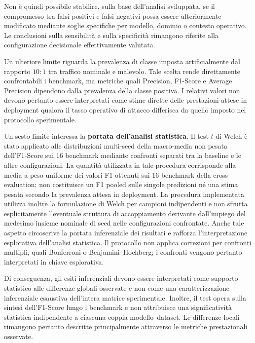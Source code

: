 Non è quindi possibile stabilire, sulla base dell'analisi sviluppata, se il compromesso tra falsi positivi e falsi negativi possa essere ulteriormente modificato mediante soglie specifiche per modello, dominio o contesto operativo.
Le conclusioni sulla sensibilità e sulla specificità rimangono riferite alla configurazione decisionale effettivamente valutata.

Un ulteriore limite riguarda la prevalenza di classe imposta artificialmente dal rapporto $10{:}1$ tra traffico nominale e malevolo. 
Tale scelta rende direttamente confrontabili i benchmark, ma metriche quali Precision, F1-Score e Average Precision dipendono dalla prevalenza della classe positiva. 
I relativi valori non devono pertanto essere interpretati come stime dirette delle prestazioni attese in deployment qualora il tasso operativo di attacco differisca da quello imposto nel protocollo sperimentale.

Un sesto limite interessa la \textbf{portata dell'analisi statistica}.
Il test $t$ di Welch è stato applicato alle distribuzioni multi-seed della macro-media non pesata dell'F1-Score sui 16 benchmark mediante confronti separati tra la baseline e le altre configurazioni.
La quantità utilizzata in tale procedura corrisponde alla media a peso uniforme dei valori F1 ottenuti sui 16 benchmark della cross-evaluation; non costituisce un F1 pooled sulle singole predizioni né una stima pesata secondo la prevalenza attesa in deployment.
La procedura implementata utilizza inoltre la formulazione di Welch per campioni indipendenti e non sfrutta esplicitamente l'eventuale struttura di accoppiamento derivante dall'impiego del medesimo insieme nominale di seed nelle configurazioni confrontate. Anche tale aspetto circoscrive la portata inferenziale dei risultati e rafforza l'interpretazione esplorativa dell'analisi statistica.
Il protocollo non applica correzioni per confronti multipli, quali Bonferroni o Benjamini--Hochberg; i confronti vengono pertanto interpretati in chiave esplorativa.

Di conseguenza, gli esiti inferenziali devono essere interpretati come supporto statistico alle differenze globali osservate e non come una caratterizzazione inferenziale esaustiva dell'intera matrice sperimentale.
Inoltre, il test opera sulla sintesi dell'F1-Score lungo i benchmark e non attribuisce una significatività statistica indipendente a ciascuna coppia modello--dataset.
Le differenze locali rimangono pertanto descritte principalmente attraverso le metriche prestazionali osservate.

